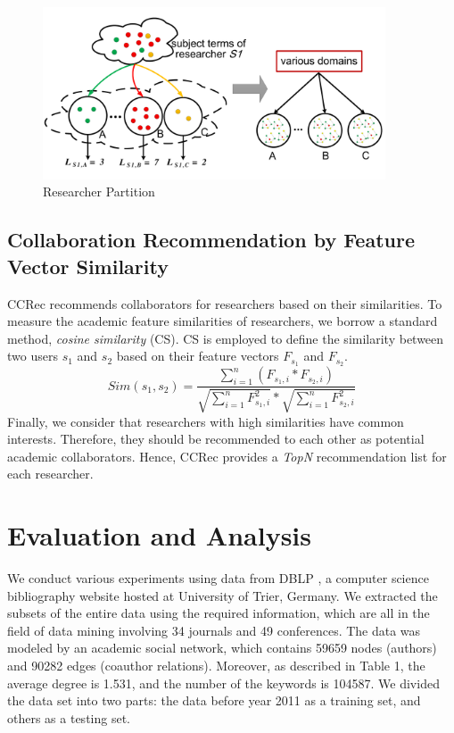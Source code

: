 \documentclass[review]{elsarticle}
\begin{document}
\begin{figure}
\centering
\includegraphics [width=4in]{Fig2.pdf}
\caption{Researcher Partition}
\end{figure}

\subsection{Collaboration Recommendation by Feature Vector Similarity}
CCRec recommends collaborators for researchers based on their similarities. To measure the academic feature similarities of researchers, we borrow a standard method, \emph{cosine similarity} (CS). CS is employed to define the similarity between two users $s_{1}$ and $s_{2}$ based on their feature vectors $F_{s_{1}}$ and $F_{s_{2}}$.
\begin{equation}
Sim(s_{1},s_{2})=\frac{\sum_{i=1}^{n}(F_{s_{1},i}*F_{s_{2},i})}{\sqrt{\sum_{i=1}^{n}F_{s_{1},i}^2}*\sqrt{\sum_{i=1}^{n}F_{s_{2},i}^2}}
\end{equation}
Finally, we consider that researchers with high similarities have common interests. Therefore, they should be recommended to each other as potential academic collaborators. Hence, CCRec provides a \emph{TopN} recommendation list for each researcher.

\section{Evaluation and Analysis}
We conduct various experiments using data from DBLP \cite{Ley:DBLP}, a computer science bibliography website hosted at University of Trier, Germany. We extracted the subsets of the entire data using the required information, which are all in the field of data mining involving 34 journals and 49 conferences. The data was modeled by an academic social network, which contains 59659 nodes (authors) and 90282 edges (coauthor relations). Moreover, as described in Table 1, the average degree is 1.531, and the number of the keywords is 104587. We divided the data set into two parts: the data before year 2011 as a training set, and others as a testing set.
\end{document}
